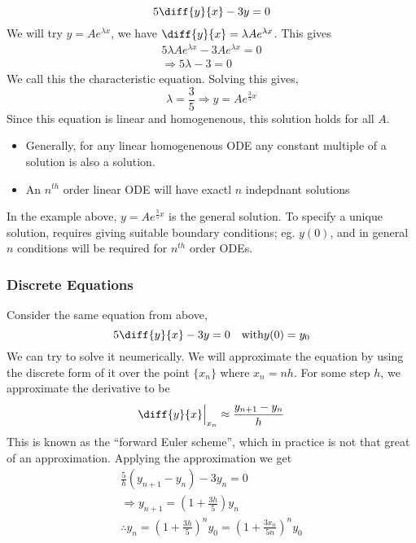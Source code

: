 \documentclass{article}
\begin{document}
\begin{eg}
    \[
        5 \diff{y}{x} - 3y = 0  
    \]
    We will try $y = Ae^{\lambda x}$, we have $\diff{y}{x} = \lambda A e^{\lambda x}$. This gives
    \begin{align*}
        5\lambda A e^{\lambda x} - 3Ae^{\lambda x} = 0 \\
        \Rightarrow 5\lambda - 3 = 0
    \end{align*}
    We call this the characteristic equation. Solving this gives,
    \[
        \lambda = \frac{3}{5} \Rightarrow y = Ae^{\frac{3}{5} x}   
    \]
    Since this equation is linear and homogenenous, this solution holds for all $A$.
\end{eg}

\begin{remark}\leavevmode
    \begin{itemize}
        \item Generally, for any linear homogenenous ODE any constant multiple of a solution is also a solution.
        \item An $n^{th}$ order linear ODE will have exactl $n$ indepdnant solutions
    \end{itemize}
    In the example above, $y = Ae^{\frac{3}{5} x}$ is the general solution. To specify a unique solution, requires giving suitable boundary conditions; eg. $y(0)$, and in general $n$ conditions will be required for $n^{th}$ order ODEs.
\end{remark}

\subsubsection*{Discrete Equations}

Consider the same equation from above,
\[
    5 \diff{y}{x} - 3y = 0 \quad \text{with} y(0) = y_0
\]
We can try to solve it neumerically. We will approximate the equation by using the discrete form of it over the point $\{x_n\}$ where $x_n = nh$. For some step $h$, we approximate the derivative to be
\[
    \diff{y}{x}\Big{|}_{x_n} \approx \frac{y_{n+1} - y_n}{h}    
\]
This is known as the ``forward Euler scheme'', which in practice is not that great of an approximation. Applying the approximation we get
\begin{align*}
    \frac{5}{h}(y_{n+1} - y_n) - 3y_n = 0 \\
    \Rightarrow y_{n+1} = (1 + \frac{3h}{5})y_{n} \\
    \therefore y_n = (1 + \frac{3h}{5})^ny_0 = (1 + \frac{3x_n}{5n})^ny_0 \tag{$x_n = nh$}
\end{align*}
\end{document}
